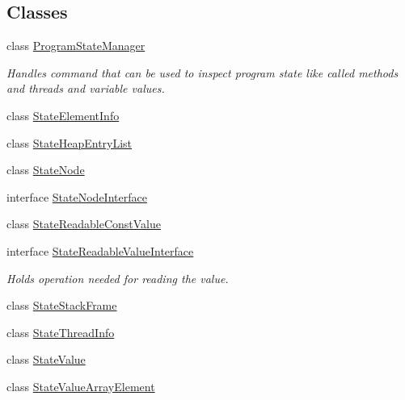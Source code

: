 \subsection*{Classes}
\begin{DoxyCompactItemize}
\item 
class \hyperlink{classgov_1_1nasa_1_1jpf_1_1inspector_1_1server_1_1programstate_1_1_program_state_manager}{Program\+State\+Manager}
\begin{DoxyCompactList}\small\item\em Handles command that can be used to inspect program state like called methods and threads and variable values. \end{DoxyCompactList}\item 
class \hyperlink{classgov_1_1nasa_1_1jpf_1_1inspector_1_1server_1_1programstate_1_1_state_element_info}{State\+Element\+Info}
\item 
class \hyperlink{classgov_1_1nasa_1_1jpf_1_1inspector_1_1server_1_1programstate_1_1_state_heap_entry_list}{State\+Heap\+Entry\+List}
\item 
class \hyperlink{classgov_1_1nasa_1_1jpf_1_1inspector_1_1server_1_1programstate_1_1_state_node}{State\+Node}
\item 
interface \hyperlink{interfacegov_1_1nasa_1_1jpf_1_1inspector_1_1server_1_1programstate_1_1_state_node_interface}{State\+Node\+Interface}
\item 
class \hyperlink{classgov_1_1nasa_1_1jpf_1_1inspector_1_1server_1_1programstate_1_1_state_readable_const_value}{State\+Readable\+Const\+Value}
\item 
interface \hyperlink{interfacegov_1_1nasa_1_1jpf_1_1inspector_1_1server_1_1programstate_1_1_state_readable_value_interface}{State\+Readable\+Value\+Interface}
\begin{DoxyCompactList}\small\item\em Holds operation needed for reading the value. \end{DoxyCompactList}\item 
class \hyperlink{classgov_1_1nasa_1_1jpf_1_1inspector_1_1server_1_1programstate_1_1_state_stack_frame}{State\+Stack\+Frame}
\item 
class \hyperlink{classgov_1_1nasa_1_1jpf_1_1inspector_1_1server_1_1programstate_1_1_state_thread_info}{State\+Thread\+Info}
\item 
class \hyperlink{classgov_1_1nasa_1_1jpf_1_1inspector_1_1server_1_1programstate_1_1_state_value}{State\+Value}
\item 
class \hyperlink{classgov_1_1nasa_1_1jpf_1_1inspector_1_1server_1_1programstate_1_1_state_value_array_element}{State\+Value\+Array\+Element}

\end{DoxyCompactItemize}
